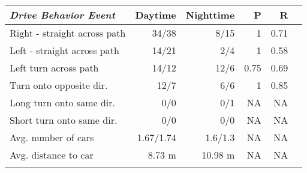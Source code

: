 
  \begin{tabular}{l r r r r r}
   \toprule
 \textbf{\textit{Drive Behavior Event}}& \textbf{Daytime} & \textbf{Nighttime} & \textbf{P} & \textbf{R} \\
    \toprule
    Right - straight across path & 34/38 & 8/15 & 1 & 0.71  \\ 
    Left - straight across path & 14/21  &  2/4  & 1 & 0.58 \\
    Left turn across path  & 14/12 & 12/6  & 0.75 & 0.69 \\ 
    Turn onto opposite dir.  & 12/7  & 6/6  & 1 & 0.85 \\ 
    Long turn onto same dir. & 0/0  & 0/1  &  NA & NA \\ 
    Short turn onto same dir. & 0/0  & 0/0 & NA & NA\\ 
    Avg. number of cars & 1.67/1.74 & 1.6/1.3 &  NA &NA  \\ 
    Avg. distance to car &  8.73 m &10.98 m &  NA& NA \\ 
    \bottomrule     
    \label{systemOverview::derivedSemantics:Results}   
  \end{tabular}
  
